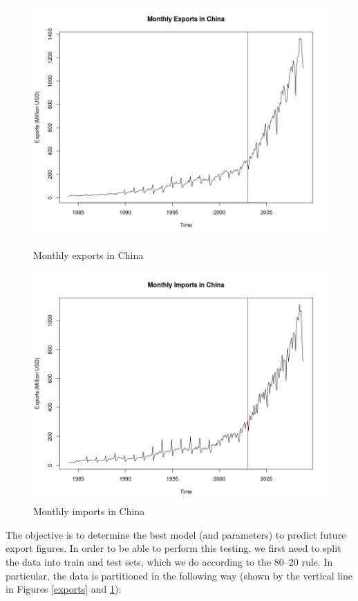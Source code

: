 \documentclass[]{article}
\begin{document}
\begin{figure}[!ht]
\centering
\begin{minipage}{.5\textwidth}
\centering
\includegraphics[width=\linewidth]{exports}
\caption{Monthly exports in China}
\label{exports}
\end{minipage}%
\begin{minipage}{.5\textwidth}
\centering
\includegraphics[width=\linewidth]{imports}
\caption{Monthly imports in China}
\label{imports}
\end{minipage}
\end{figure}

The objective is to determine the best model (and parameters) to predict future export figures. In order to be able to perform this testing, we first need to split the data into train and test sets, which we do according to the 80–20 rule. In particular, the data is partitioned in the following way (shown by the vertical line in Figures \ref{exports} and \ref{imports}):
\end{document}
